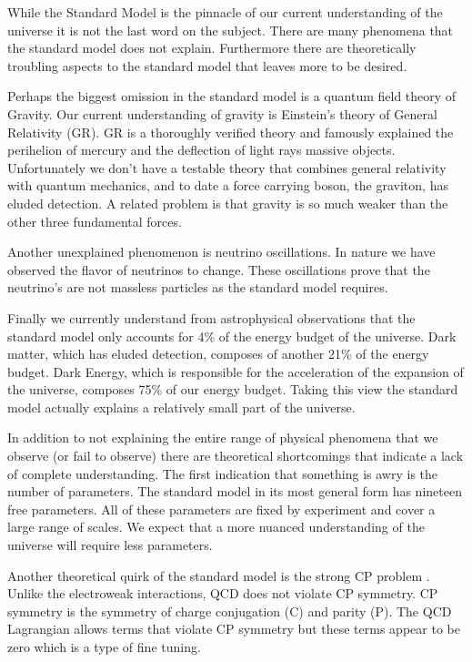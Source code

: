
While the Standard Model is the pinnacle of our current understanding of the universe it is not the last word on the subject.
There are many phenomena that the standard model does not explain.
Furthermore there are theoretically troubling aspects to the standard model that leaves more to be desired.

Perhaps the biggest omission in the standard model is a quantum field theory of Gravity.
Our current understanding of gravity is Einstein's theory of General Relativity (GR).
GR is a thoroughly verified theory and famously explained the perihelion of mercury and the deflection of light rays massive objects.
Unfortunately we don't have a testable theory that combines general relativity with quantum mechanics, and to date a force carrying boson, the graviton, has eluded detection.
A related problem is that gravity is so much weaker than the other three fundamental forces.

Another unexplained phenomenon is neutrino oscillations.
In nature we have observed the flavor of neutrinos to change.
These oscillations prove that the neutrino's are not massless particles as the standard model requires.

Finally we currently understand from astrophysical observations that the standard model only accounts for 4\% of the energy budget of the universe.
Dark matter, which has eluded detection, composes of another 21\% of the energy budget.
Dark Energy, which is responsible for the acceleration of the expansion of the universe, composes 75\% of our energy budget.
Taking this view the standard model actually explains a relatively small part of the universe.

In addition to not explaining the entire range of physical phenomena that we observe (or fail to observe) there are theoretical shortcomings that indicate a lack of complete understanding.
The first indication that something is awry is the number of parameters.
The standard model in its most general form has nineteen free parameters.
All of these parameters are fixed by experiment and cover a large range of scales.
We expect that a more nuanced understanding of the universe will require less parameters.

Another theoretical quirk of the standard model is the strong CP problem \cite{Dine:strongcp}.
Unlike the electroweak interactions, QCD does not violate CP symmetry.
CP symmetry is the symmetry of charge conjugation (C) and parity (P).
The QCD Lagrangian allows terms that violate CP symmetry but these terms appear to be zero which is a type of fine tuning.

